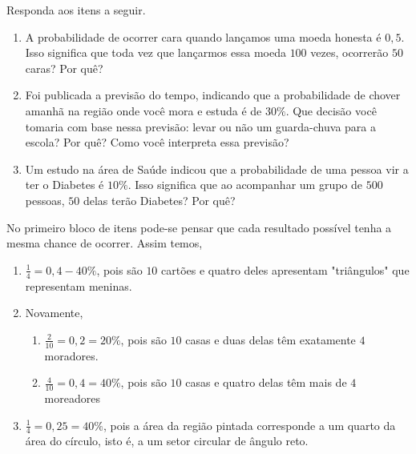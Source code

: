 \documentclass[10 pt,usenames,dvipsnames, oneside]{article}
\begin{document}
Responda aos itens a seguir.
\begin{enumerate}
\item {} 
A probabilidade de ocorrer cara quando lançamos uma moeda honesta é $0{,}5$. Isso significa que toda vez que lançarmos essa moeda $100$ vezes, ocorrerão $50$ caras? Por quê?

\item {} 
Foi publicada a previsão do tempo, indicando que a probabilidade de chover amanhã na região onde você mora e estuda é de $30\%$. Que decisão você tomaria com base nessa previsão: levar ou não um guarda-chuva para a escola? Por quê? Como você interpreta essa previsão?

\item {} 
Um estudo na área de Saúde indicou que a probabilidade de uma pessoa vir a ter o Diabetes é $10\%$. Isso significa que ao acompanhar um grupo de $500$ pessoas, $50$ delas terão Diabetes? Por quê?

\end{enumerate}

\ifdefined\prof
\begin{solucao}

No primeiro bloco de itens pode-se pensar que cada resultado possível tenha a mesma chance de ocorrer. Assim temos,
\begin{enumerate}
\item $\frac{1}{4}=0{,}4-40\%$, pois são $10$ cartões e quatro deles apresentam "triângulos"{} que representam meninas.
\item Novamente,
\begin{enumerate}
\item $\frac{2}{10}=0{,}2=20\%$, pois são $10$ casas e duas delas têm exatamente $4$ moradores.
\item $\frac{4}{10}=0{,}4=40\%$, pois são $10$ casas e quatro delas têm mais de $4$ moreadores
\end{enumerate}
\item $\frac{1}{4}=0{,}25=40\%$, pois a área da região pintada corresponde a um quarto da área do círculo, isto é, a um setor circular de ângulo reto.
\end{enumerate}

\end{solucao}
\fi
\end{document}
